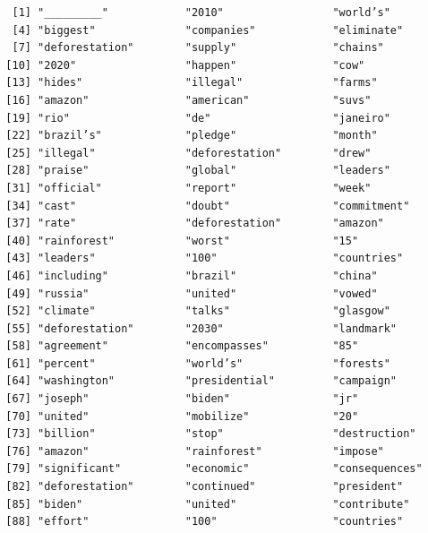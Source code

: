 \documentclass[
  letterpaper,
  DIV=11,
  numbers=noendperiod]{scrartcl}
\newenvironment{Shaded}{\begin{snugshade}}{\end{snugshade}}
\newcommand{\NormalTok}[1]{\textcolor[rgb]{0.00,0.23,0.31}{#1}}
\newcommand{\SpecialCharTok}[1]{\textcolor[rgb]{0.37,0.37,0.37}{#1}}
\begin{document}
\begin{Shaded}
\end{Shaded}

\begin{verbatim}
   [1] "_________"            "2010"                 "world’s"             
   [4] "biggest"              "companies"            "eliminate"           
   [7] "deforestation"        "supply"               "chains"              
  [10] "2020"                 "happen"               "cow"                 
  [13] "hides"                "illegal"              "farms"               
  [16] "amazon"               "american"             "suvs"                
  [19] "rio"                  "de"                   "janeiro"             
  [22] "brazil’s"             "pledge"               "month"               
  [25] "illegal"              "deforestation"        "drew"                
  [28] "praise"               "global"               "leaders"             
  [31] "official"             "report"               "week"                
  [34] "cast"                 "doubt"                "commitment"          
  [37] "rate"                 "deforestation"        "amazon"              
  [40] "rainforest"           "worst"                "15"                  
  [43] "leaders"              "100"                  "countries"           
  [46] "including"            "brazil"               "china"               
  [49] "russia"               "united"               "vowed"               
  [52] "climate"              "talks"                "glasgow"             
  [55] "deforestation"        "2030"                 "landmark"            
  [58] "agreement"            "encompasses"          "85"                  
  [61] "percent"              "world’s"              "forests"             
  [64] "washington"           "presidential"         "campaign"            
  [67] "joseph"               "biden"                "jr"                  
  [70] "united"               "mobilize"             "20"                  
  [73] "billion"              "stop"                 "destruction"         
  [76] "amazon"               "rainforest"           "impose"              
  [79] "significant"          "economic"             "consequences"        
  [82] "deforestation"        "continued"            "president"           
  [85] "biden"                "united"               "contribute"          
  [88] "effort"               "100"                  "countries"           

\end{verbatim}
\end{document}
